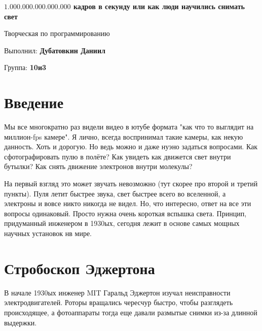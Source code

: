 \documentclass[a4paper, 11pt]{extarticle}
\begin{document}
\begin{titlepage}
    \centering
    
    \vspace*{0cm}
    
    \vfill
    \vfill
    
    {\LARGE \textbf{$1.000.000.000.000.000$ кадров в секунду или как люди научились снимать свет}}\\ 
    \vspace{0.3cm}

    {\large Творческая по программированию}\\
    \vspace{1.0cm}
    
    {\large Выполнил: \textbf{Дубатовкин Даниил}}\\
    \vspace{0.3cm}
    
    {\large Группа: \textbf{10и3}}\\
    
    \vfill
    \vfill
    
\end{titlepage}
\newpage

\section{Введение}

Мы все многократно раз видели видео в ютубе формата "как что то выглядит на миллион-fps камере". Я лично, всегда воспринимал такие камеры, как некую данность. Хоть и дорогую. Но ведь можно и даже нуэно задаться вопросами. Как сфотографировать пулю в полёте? Как увидеть как движется свет внутри бутылки? Как снять движение электронов внутри молекулы?

На первый взгляд это может звучать невозможно (тут скорее про второй и третий пункты). Пуля летит быстрее звука, свет быстрее всего во вселенной, а электроны и вовсе никто никогда не видел. Но, что интересно, ответ на все эти вопросы одинаковый. Просто нужна очень короткая вспышка света. Принцип, придуманный инженером в 1930ых, сегодня лежит в основе самых мощных научных установок нв мире.

\section{Стробоскоп Эджертона}

В начале 1930ых инженер MIT Гаральд Эджертон изучал неисправности электродвигателей. Роторы вращались чересчур быстро, чтобы разглядеть происходящее, а фотоаппараты тогда еще давали размытые снимки из-за длинной выдержки.
\end{document}

